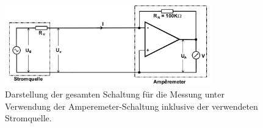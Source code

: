 \begin{figure}[h!]
	\centering
	\includegraphics[width = 0.8\textwidth]{../Grafiken/Messung_Amperemeter.png}
	\caption{Darstellung der gesamten Schaltung für die Messung unter Verwendung der Amperemeter-Schaltung inklusive 
		der verwendeten Stromquelle. \cite{V51}\label{fig:Messung_Amperemeter}}
\end{figure}

